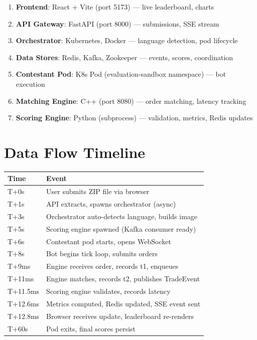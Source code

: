 \documentclass[10pt,a4paper,oneside]{report}
\begin{document}
\begin{enumerate}
    \item \textbf{Frontend}: React + Vite (port 5173) — live leaderboard, charts
    \item \textbf{API Gateway}: FastAPI (port 8000) — submissions, SSE stream
    \item \textbf{Orchestrator}: Kubernetes, Docker — language detection, pod lifecycle
    \item \textbf{Data Stores}: Redis, Kafka, Zookeeper — events, scores, coordination
    \item \textbf{Contestant Pod}: K8s Pod (evaluation-sandbox namespace) — bot execution
    \item \textbf{Matching Engine}: C++ (port 8080) — order matching, latency tracking
    \item \textbf{Scoring Engine}: Python (subprocess) — validation, metrics, Redis updates
\end{enumerate}

\section{Data Flow Timeline}

\small\begin{tabular}{ll}
\toprule
\textbf{Time} & \textbf{Event} \\
\midrule
T+0s & User submits ZIP file via browser \\
T+1s & API extracts, spawns orchestrator (async) \\
T+3s & Orchestrator auto-detects language, builds image \\
T+5s & Scoring engine spawned (Kafka consumer ready) \\
T+6s & Contestant pod starts, opens WebSocket \\
T+8s & Bot begins tick loop, submits orders \\
T+9ms & Engine receives order, records t1, enqueues \\
T+11ms & Engine matches, records t2, publishes TradeEvent \\
T+11.5ms & Scoring engine validates, records latency \\
T+12.6ms & Metrics computed, Redis updated, SSE event sent \\
T+12.8ms & Browser receives update, leaderboard re-renders \\
T+60s & Pod exits, final scores persist \\
\bottomrule
\end{tabular}
\end{document}
